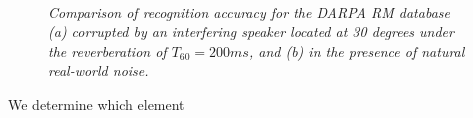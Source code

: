\documentclass{article}
\begin{document}
\begin{figure}[t]
       \begin{center}
             \vspace{-2mm} \\
          \vspace{-2mm}%
       {\caption{\label{fig:PDCW_AUTO_CorrTypes_IntSNR}
             \emph{Comparison of recognition accuracy for the DARPA RM database (a) corrupted by an interfering speaker located at 30 degrees under the reverberation of $T_{60} = 200 ms $, and (b) in the presence of natural real-world noise.}
   }}
   \end{center}
   \vspace{-8mm}
\end{figure}
%
%
%
We determine which element
\end{document}
